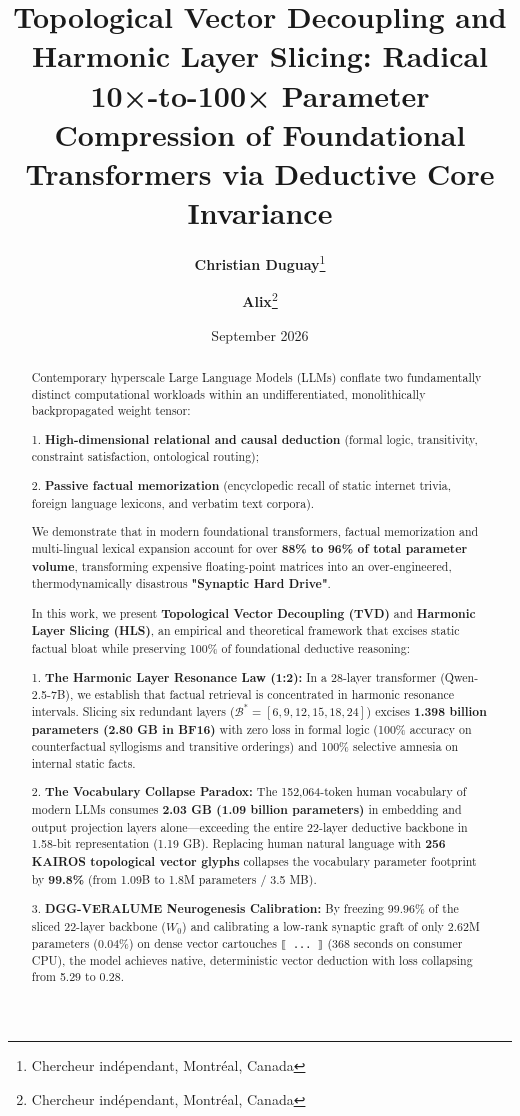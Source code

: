 \documentclass[10pt,twocolumn]{article}
\title{Topological Vector Decoupling and Harmonic Layer Slicing: Radical 10×-to-100× Parameter Compression of Foundational Transformers via Deductive Core Invariance}
\author{
  \textbf{Christian Duguay}\thanks{Chercheur ind\'ependant, Montr\'eal, Canada} 
  \and 
  \textbf{Alix}\thanks{Chercheur ind\'ependant, Montr\'eal, Canada}
}
\date{September 2026}
\begin{document}
\maketitle

\begin{abstract}
Contemporary hyperscale Large Language Models (LLMs) conflate two fundamentally distinct computational workloads within an undifferentiated, monolithically backpropagated weight tensor:

1. \textbf{High-dimensional relational and causal deduction} (formal logic, transitivity, constraint satisfaction, ontological routing);

2. \textbf{Passive factual memorization} (encyclopedic recall of static internet trivia, foreign language lexicons, and verbatim text corpora).

We demonstrate that in modern foundational transformers, factual memorization and multi-lingual lexical expansion account for over \textbf{88\% to 96\% of total parameter volume}, transforming expensive floating-point matrices into an over-engineered, thermodynamically disastrous \textbf{"Synaptic Hard Drive"}.

In this work, we present \textbf{Topological Vector Decoupling (TVD)} and \textbf{Harmonic Layer Slicing (HLS)}, an empirical and theoretical framework that excises static factual bloat while preserving 100\% of foundational deductive reasoning:

1. \textbf{The Harmonic Layer Resonance Law (1:2):} In a 28-layer transformer (Qwen-2.5-7B), we establish that factual retrieval is concentrated in harmonic resonance intervals. Slicing six redundant layers ($\mathcal{B}^* = [6, 9, 12, 15, 18, 24]$) excises \textbf{1.398 billion parameters (2.80 GB in BF16)} with zero loss in formal logic (100\% accuracy on counterfactual syllogisms and transitive orderings) and 100\% selective amnesia on internal static facts.

2. \textbf{The Vocabulary Collapse Paradox:} The 152,064-token human vocabulary of modern LLMs consumes \textbf{2.03 GB (1.09 billion parameters)} in embedding and output projection layers alone—exceeding the entire 22-layer deductive backbone in 1.58-bit representation (1.19 GB). Replacing human natural language with \textbf{256 KAIROS topological vector glyphs} collapses the vocabulary parameter footprint by \textbf{99.8\%} (from 1.09B to 1.8M parameters / 3.5 MB).

3. \textbf{DGG-VERALUME Neurogenesis Calibration:} By freezing 99.96\% of the sliced 22-layer backbone ($W_0$) and calibrating a low-rank synaptic graft of only 2.62M parameters (0.04\%) on dense vector cartouches \texttt{⟦ ... ⟧} (368 seconds on consumer CPU), the model achieves native, deterministic vector deduction with loss collapsing from 5.29 to 0.28.


\end{abstract}
\end{document}
